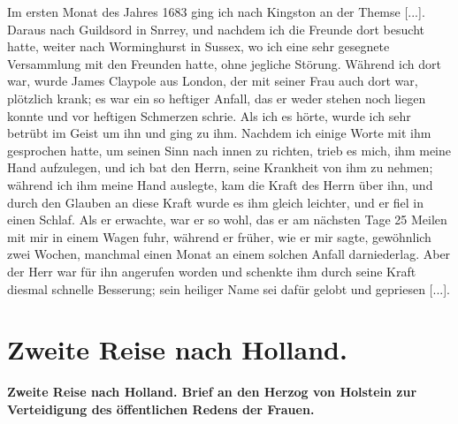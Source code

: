 Im ersten Monat des Jahres 1683 ging ich nach Kingston
an der Themse [...]. Daraus nach Guildsord in Snrrey, und
nachdem ich die Freunde dort besucht hatte, weiter nach 
Worminghurst in Sussex, wo ich 
eine sehr gesegnete Versammlung
mit den Freunden hatte, ohne jegliche Störung. Während ich
dort war, wurde James Claypole aus London, der mit seiner
Frau auch dort war, plötzlich krank; es war ein so heftiger Anfall,
das er weder stehen noch liegen konnte und vor heftigen Schmerzen
schrie. Als ich es hörte, wurde ich sehr betrübt im Geist um ihn
und ging zu ihm. Nachdem ich einige Worte mit ihm gesprochen
hatte, um seinen Sinn nach innen zu richten, trieb es mich, ihm
meine Hand aufzulegen, und ich bat den Herrn, seine Krankheit
von ihm zu nehmen; während ich ihm meine Hand auslegte, kam
die Kraft des Herrn über ihn, und durch den Glauben an diese
Kraft wurde es ihm gleich leichter, und er fiel in einen Schlaf.
Als er erwachte, war er so wohl, das er am nächsten Tage
25 Meilen mit mir in einem Wagen fuhr, während er früher,
wie er mir sagte, gewöhnlich zwei Wochen, manchmal einen
Monat an einem solchen Anfall darniederlag. Aber der Herr
war für ihn angerufen worden und schenkte ihm durch seine Kraft
diesmal schnelle Besserung; sein heiliger Name sei dafür gelobt
und gepriesen [...].


\chapter[Zweite Reise nach Holland.]{Zweite Reise nach Holland.}

\begin{center}
\textbf{Zweite Reise nach Holland. Brief an den Herzog von Holstein
zur Verteidigung des öffentlichen Redens der Frauen.}
\end{center}


